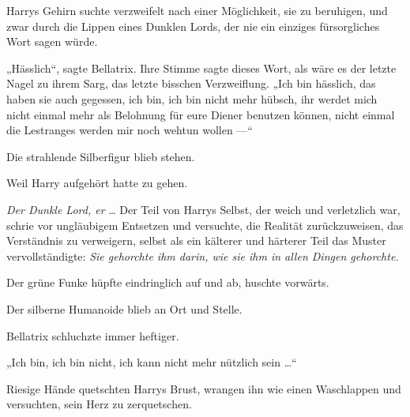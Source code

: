 Harrys Gehirn suchte verzweifelt nach einer Möglichkeit, sie zu beruhigen, und zwar durch die Lippen eines Dunklen Lords, der nie ein einziges fürsorgliches Wort sagen würde.

„Hässlich“, sagte Bellatrix. Ihre Stimme sagte dieses Wort, als wäre es der letzte Nagel zu ihrem Sarg, das letzte bisschen Verzweiflung.
„Ich bin hässlich, das haben sie auch gegessen, ich bin, ich bin nicht mehr hübsch, ihr werdet mich nicht einmal mehr als Belohnung für eure Diener benutzen können, nicht einmal die Lestranges werden mir noch wehtun wollen —“

Die strahlende Silberfigur blieb stehen.

Weil Harry aufgehört hatte zu gehen.

\emph{Der Dunkle Lord, er} … Der Teil von Harrys Selbst, der weich und verletzlich war, schrie vor ungläubigem Entsetzen und versuchte, die Realität zurückzuweisen, das Verständnis zu verweigern, selbst als ein kälterer und härterer Teil das Muster vervollständigte: \emph{Sie gehorchte ihm darin, wie sie ihm in allen Dingen gehorchte.}

Der grüne Funke hüpfte eindringlich auf und ab, huschte vorwärts.

Der silberne Humanoide blieb an Ort und Stelle.

Bellatrix schluchzte immer heftiger.

„Ich bin, ich bin nicht, ich kann nicht mehr nützlich sein …“

Riesige Hände quetschten Harrys Brust, wrangen ihn wie einen Waschlappen und versuchten, sein Herz zu zerquetschen.

